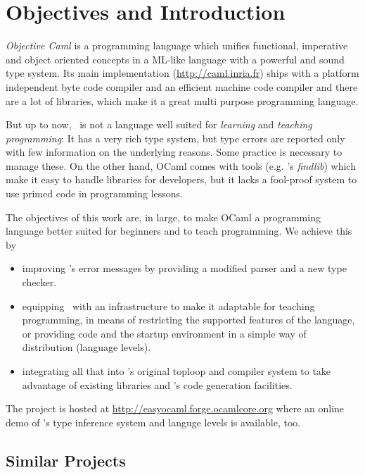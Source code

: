 
\section{Objectives and Introduction}
\label{sec:intro}

\label{hd001}
\textsl{Objective Caml} \citep{leroy2008} is a programming language which unifies 
functional, imperative and object oriented concepts in a ML-like 
language with a powerful and sound type system.  Its main implementation 
(\url{http://caml.inria.fr}) ships with a platform independent byte code
compiler and an efficient machine code compiler and there are a lot of
libraries, which make it a great multi purpose programming language.

But up to now, \ocaml\ is not a language well suited for \emph{learning} and
\emph{teaching programming}:
It has a very rich type system, but type errors are reported only with few
information on the underlying reasons.
Some practice is necessary to manage these.
On the other hand, OCaml comes with tools (e.g.  \citeauthor{stolpmann}'s
\emph{findlib}) which make it easy to handle libraries for developers, but it
lacks a fool-proof system to use primed code in programming lessons.

The objectives of this work are, in large, to make OCaml a
programming language better suited for beginners and to teach programming. We
achieve this by

\begin{itemize}
    \item improving \ocaml's error messages by providing a modified 
        parser and a new type checker.
    \item equipping \ocaml\ with an infrastructure to make it 
        adaptable for teaching programming, in means of restricting the 
        supported features of the language, or providing code and the 
        startup environment in a simple way of distribution (language 
        levels).
    \item integrating all that into \ocaml's original toploop and 
        compiler system to take advantage of existing libraries and 
        \ocaml's code generation facilities.
\end{itemize}
The project is hosted at
\url{http://easyocaml.forge.ocamlcore.org}  where an online demo of \easyocaml's
type inference system and languge levels is available, too.

\subsection*{Similar Projects}

